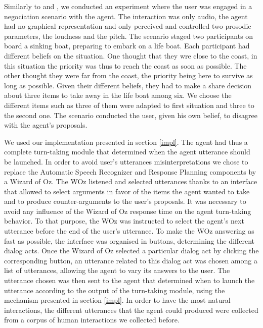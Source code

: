 Similarly to \cite{de_vault_toward_2015} and \citep{skantze_towards_2010}, we conducted an experiment where the user was engaged in a negociation scenario with the agent. The interaction was only audio, the agent had no graphical representation and only perceived and controlled two prosodic parameters, the loudness and the pitch. 
The scenario staged two participants on board a sinking boat, preparing to embark on a life boat. 
Each participant had different beliefs on the situation. 
One thought that they wre close to the coast, in this situation the priority was thus to reach the coast as soon as possible. 
The other thought they were far from the coast, the priority being here to survive as long as possible. 
Given their different beliefs, they had to make a share decision about three items to take away in the life boat among six. We choose the different items such as three of them were adapted to first situation 
and three to the second one.
The scenario conducted the user, given his own belief, to disagree with the agent's proposals.   

We used our implementation presented in section \ref{impl}. The agent had thus a complete turn-taking module that determined when the agent utterance should be launched. In order to avoid user's utterances misinterpretations we chose to replace the Automatic Speech Recognizer and Response Planning components by a Wizard of Oz. The WOz listened and selected utterances thanks to an interface that allowed to select arguments in favor of the items the agent wanted to take and to produce counter-arguments to the user's proposals. It was necessary to avoid any influence of the Wizard of Oz response time on the agent turn-taking behavior. To that purpose, the WOz was instructed to select the agent's next utterance before the end of the user's utterance. 
To make the WOz answering as fast as possible, the interface was organised in buttons, determining the different dialog acts. Once the Wizard of Oz selected a particular dialog act by clicking the corresponding button, an utterance related to this dialog act was chosen among a list of utterances, allowing the agent to vary its answers to the user. The utterance chosen was then sent to the agent that determined when to launch the utterance according to the output of the turn-taking module, using the mechanism presented in section \ref{impl}. In order to have the most natural interactions, the different utterances that the agent could produced were collected from a corpus of human interactions we collected before. 

